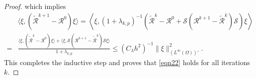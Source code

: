 \documentclass[10pt,a4paper]{amsart}
\begin{document}
\begin{proof}
which implies
\begin{equation*}
\begin{aligned}
&\langle \xi, (\widetilde{\mathcal{R}}^{k+1}-\mathcal{R}^{0})\xi \rangle = \left\langle \xi,(1 + \lambda_{k,p})^{-1}\left(\widetilde{\mathcal{R}}^{k}-\mathcal{R}^{0}+\mathcal{S}\left(\mathcal{R}^{k+1}-\widetilde{\mathcal{R}}^{k}\right)\mathcal{S}\right) \xi \right\rangle\\
=& \frac{\langle \xi, (\widetilde{\mathcal{R}}^{k}-\mathcal{R}^{0} ) \xi \rangle+\langle \xi, \mathcal{S}(\mathcal{R}^{k+1}- \widetilde{\mathcal{R}}^{k})\mathcal{S} \xi \rangle}{1 + \lambda_{k,p}}
\leq \left(C_{\lambda}h^{2}\right)^{-1}\|\xi\|_{(L^{\infty}(\Omega))'}^{2}.
\end{aligned}
\end{equation*}
This completes the inductive step and proves that \eqref{eqn22} holds for all iterations $k$.
\end{proof}
\end{document}
